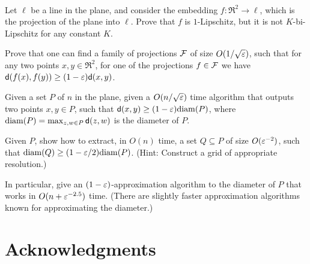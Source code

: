 
\begin{exercise}~
    \begin{compactenuma}
        \item {} Let $\ell$ be a line in the plane, and
        consider the embedding $f:\Re^2 \rightarrow \ell$, which is
        the projection of the plane into $\ell$.  Prove that $f$ is
        $1$-Lipschitz, but it is not $K$-bi-Lipschitz for any constant
        $K$.
        
        \item {} Prove that one can find a family of
        projections $\mathcal{F}$ of size $O(1/\sqrt{{\varepsilon}})$, such that for any
        two points $x,y \in \Re^2$, for one of the projections $f \in
        \mathcal{F}$ we have $\mathsf{d}(f(x), f(y)) \geq (1-{\varepsilon})\mathsf{d}(x,y)$.
        
        \item {} Given a set $P$ of $n$ in the plane, given
        a $O(n/\sqrt{{\varepsilon}})$ time algorithm that outputs two points
        $x,y \in P$, such that $\mathsf{d}(x,y) \geq (1-{\varepsilon})\mathrm{diam}(P)$,
        where $\mathrm{diam}(P) = \max_{z,w\in P} \mathsf{d}(z,w)$ is the
        diameter of $P$.
        
        \item {} Given $P$, show how to extract, in $O(n)$
        time, a set $Q\subseteq P$ of size $O({\varepsilon}^{-2})$, such that
        $\mathrm{diam}(Q)\geq (1-{\varepsilon}/2)\mathrm{diam}(P)$. (Hint: Construct a grid of
        appropriate resolution.)
        
        In particular, give an $(1-{\varepsilon})$-approximation algorithm to
        the diameter of $P$ that works in $O(n + {\varepsilon}^{-2.5})$ time.
        (There are slightly faster approximation algorithms known for
        approximating the diameter.)
    \end{compactenuma}
\end{exercise}



\section*{Acknowledgments}

